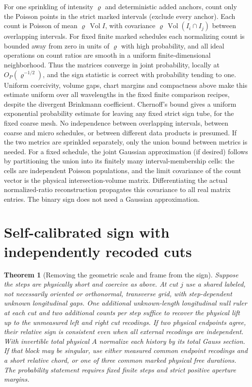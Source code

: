 \documentclass[11pt]{article}
\newtheorem{theorem}{Theorem}
\begin{document}
For one sprinkling of intensity \(\varrho\) and deterministic added anchors, count only the Poisson points in the strict marked intervals (exclude every anchor). Each count is Poisson of mean \(\varrho\,\operatorname{Vol}I\), with covariance \(\varrho\,\operatorname{Vol}(I_i\cap I_j)\) between overlapping intervals. For fixed finite marked schedules each normalizing count is bounded away from zero in units of \(\varrho\) with high probability, and all ideal operations on count ratios are smooth in a uniform finite-dimensional neighborhood. Thus the matrices converge in joint probability, locally at \(O_P(\varrho^{-1/2})\), and the sign statistic is correct with probability tending to one. Uniform coercivity, volume gaps, chart margins and compactness above make this estimate uniform over all wavelengths in the fixed finite comparison recipes, despite the divergent Brinkmann coefficient. Chernoff's bound gives a uniform exponential probability estimate for leaving any fixed strict sign tube, for the fixed coarse mesh. No independence between overlapping intervals, between coarse and micro schedules, or between different data products is presumed. If the two metrics are sprinkled separately, only the union bound between metrics is needed. For a fixed schedule, the joint Gaussian approximation (if desired) follows by partitioning the union into its finitely many interval-membership cells: the cells are independent Poisson populations, and the limit covariance of the count vector is the physical intersection-volume matrix. Differentiating the actual normalized-ratio reconstruction propagates this covariance to all real matrix entries. The binary sign does not need a Gaussian approximation.



\section{Self-calibrated sign with independently recoded cuts}\label{sec:selfcal}
\begin{theorem}[Removing the geometric scale and frame from the sign]\label{thm:selfcal}
Suppose the steps are physically short and coercive as above.
At cut \(j\) use a shared labeled, not necessarily oriented or
orthonormal, transverse grid, with step-dependent unknown
longitudinal gaps. One additional unknown-length longitudinal null
ruler at each cut and two additional counts per step suffice to
recover the physical lift up to the unmeasured left and right cut
recodings. If two physical endpoints agree, their relative sign is
consistent even when all external recodings are independent. With
invertible total physical \(A\) normalize each history by its total
Gauss section. If that block may be singular, use either measured
common endpoint recodings and a short relative chord, or one of
three common marked physical free durations. The probability
statement requires fixed finite steps and strict positive aperture
margins.
\end{theorem}
\end{document}
